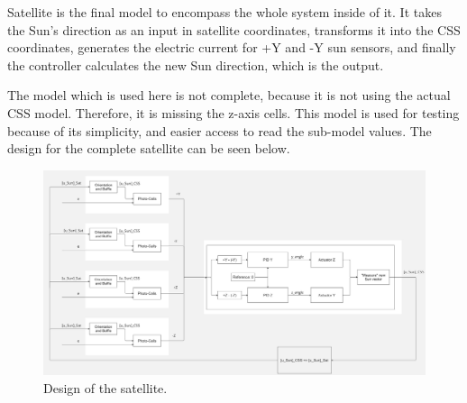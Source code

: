 Satellite is the final model to encompass the whole system inside of it. It takes the Sun's direction as an input in satellite coordinates, transforms it into the CSS coordinates, generates the electric current for +Y and -Y sun sensors, and finally the controller calculates the new Sun direction, which is the output. 

The model which is used here is not complete, because it is not using the actual CSS model. Therefore, it is missing the z-axis cells. This model is used for testing because of its simplicity, and easier access to read the sub-model values. The design for the complete satellite can be seen below.

\begin{figure}[H]
    \centering
    \includegraphics[width=1.0\linewidth]{doc//Graphics/controller.jpg}
    \caption{Design of the satellite.}
    \label{fig:satelliteDesign}
\end{figure}
